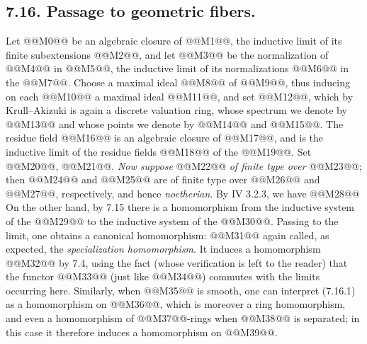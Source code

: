 \subsection*{7.16. Passage to geometric fibers.}
Let @@M0@@ be an algebraic closure of @@M1@@, the inductive limit of its finite subextensions @@M2@@, and let @@M3@@ be the normalization of @@M4@@ in @@M5@@, the inductive limit of its normalizations @@M6@@ in the @@M7@@. Choose a maximal ideal @@M8@@ of @@M9@@, thus inducing on each @@M10@@ a maximal ideal @@M11@@, and set @@M12@@, which by Krull--Akizuki is again a discrete valuation ring, whose spectrum we denote by @@M13@@ and whose points we denote by @@M14@@ and @@M15@@. The residue field @@M16@@ is an algebraic closure of @@M17@@, and is the inductive limit of the residue fields @@M18@@ of the @@M19@@. Set @@M20@@, @@M21@@. \emph{Now suppose} @@M22@@ \emph{of finite type over} @@M23@@; then @@M24@@ and @@M25@@ are of finite type over @@M26@@ and @@M27@@, respectively, and hence \emph{noetherian}. By IV 3.2.3, we have
@@M28@@
On the other hand, by 7.15 there is a homomorphism from the inductive system of the @@M29@@ to the inductive system of the @@M30@@. Passing to the limit, one obtains a canonical homomorphism:
@@M31@@
again called, as expected, the \emph{specialization homomorphism}. It induces a homomorphism @@M32@@ by 7.4, using the fact (whose verification is left to the reader) that the functor @@M33@@ (just like @@M34@@) commutes with the limits occurring here. Similarly, when @@M35@@ is smooth, one can interpret (7.16.1) as a homomorphism on @@M36@@, which is moreover a ring homomorphism, and even a homomorphism of @@M37@@-rings when @@M38@@ is separated; in this case it therefore induces a homomorphism on @@M39@@.


